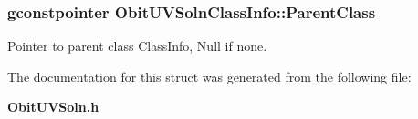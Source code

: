 \subsubsection{\setlength{\rightskip}{0pt plus 5cm}gconstpointer {\bf Obit\-UVSoln\-Class\-Info::Parent\-Class}}\label{structObitUVSolnClassInfo_o3}


Pointer to parent class Class\-Info, Null if none. 



The documentation for this struct was generated from the following file:\begin{CompactItemize}
\item 
{\bf Obit\-UVSoln.h}\end{CompactItemize}
